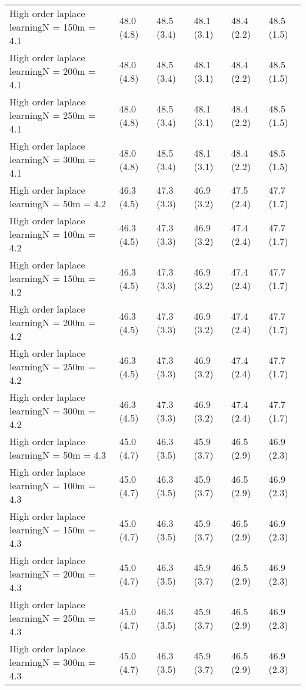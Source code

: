 \documentclass{article}
\begin{document}
\begin{table*}[t!]
\begin{center}
\begin{small}
\begin{sc}
\begin{tabular}{llllll}
High order laplace learningN = 150m = 4.1&48.0 (4.8)      &48.5 (3.4)      &48.1 (3.1)      &48.4 (2.2)      &48.5 (1.5)      \\
High order laplace learningN = 200m = 4.1&48.0 (4.8)      &48.5 (3.4)      &48.1 (3.1)      &48.4 (2.2)      &48.5 (1.5)      \\
High order laplace learningN = 250m = 4.1&48.0 (4.8)      &48.5 (3.4)      &48.1 (3.1)      &48.4 (2.2)      &48.5 (1.5)      \\
High order laplace learningN = 300m = 4.1&48.0 (4.8)      &48.5 (3.4)      &48.1 (3.1)      &48.4 (2.2)      &48.5 (1.5)      \\
High order laplace learningN = 50m = 4.2&46.3 (4.5)      &47.3 (3.3)      &46.9 (3.2)      &47.5 (2.4)      &47.7 (1.7)      \\
High order laplace learningN = 100m = 4.2&46.3 (4.5)      &47.3 (3.3)      &46.9 (3.2)      &47.4 (2.4)      &47.7 (1.7)      \\
High order laplace learningN = 150m = 4.2&46.3 (4.5)      &47.3 (3.3)      &46.9 (3.2)      &47.4 (2.4)      &47.7 (1.7)      \\
High order laplace learningN = 200m = 4.2&46.3 (4.5)      &47.3 (3.3)      &46.9 (3.2)      &47.4 (2.4)      &47.7 (1.7)      \\
High order laplace learningN = 250m = 4.2&46.3 (4.5)      &47.3 (3.3)      &46.9 (3.2)      &47.4 (2.4)      &47.7 (1.7)      \\
High order laplace learningN = 300m = 4.2&46.3 (4.5)      &47.3 (3.3)      &46.9 (3.2)      &47.4 (2.4)      &47.7 (1.7)      \\
High order laplace learningN = 50m = 4.3&45.0 (4.7)      &46.3 (3.5)      &45.9 (3.7)      &46.5 (2.9)      &46.9 (2.3)      \\
High order laplace learningN = 100m = 4.3&45.0 (4.7)      &46.3 (3.5)      &45.9 (3.7)      &46.5 (2.9)      &46.9 (2.3)      \\
High order laplace learningN = 150m = 4.3&45.0 (4.7)      &46.3 (3.5)      &45.9 (3.7)      &46.5 (2.9)      &46.9 (2.3)      \\
High order laplace learningN = 200m = 4.3&45.0 (4.7)      &46.3 (3.5)      &45.9 (3.7)      &46.5 (2.9)      &46.9 (2.3)      \\
High order laplace learningN = 250m = 4.3&45.0 (4.7)      &46.3 (3.5)      &45.9 (3.7)      &46.5 (2.9)      &46.9 (2.3)      \\
High order laplace learningN = 300m = 4.3&45.0 (4.7)      &46.3 (3.5)      &45.9 (3.7)      &46.5 (2.9)      &46.9 (2.3)      \\

\end{tabular}
\end{sc}
\end{small}
\end{center}
\end{table*}
\end{document}
